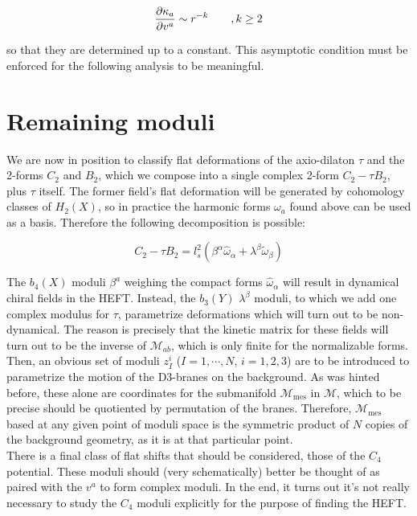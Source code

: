 \begin{equation}
	\frac{\partial\kappa_a}{\partial v^a} \sim r^{-k} \quad \quad, k \geq 2
	\label{asycond}
\end{equation}

so that they are determined up to a constant. This asymptotic condition must be enforced for the following analysis to be meaningful.

\section{Remaining moduli}

We are now in position to classify flat deformations of the axio-dilaton $\tau$ and the 2-forms $C_2$ and $B_2$, which we compose into a single complex 2-form $C_2 - \tau B_2$, plus $\tau$ itself. The former field's flat deformation will be generated by cohomology classes of $H_2(X)$, so in practice the harmonic forms $\omega_a$ found above can be used as a basis. Therefore the following decomposition is possible:

\begin{equation}
	C_2 - \tau B_2 = l_s^2 \left( \beta^\alpha \hat\omega_\alpha + \lambda^\beta \tilde \omega_\beta \right)
	\label{}
\end{equation}

The $b_4(X)$ moduli $\beta^a$ weighing the compact forms $\hat\omega_\alpha$ will result in dynamical chiral fields in the HEFT. Instead, the $b_3(Y)$ $\lambda^\beta$ moduli, to which we add one complex modulus for $\tau$, parametrize deformations which will turn out to be non-dynamical. The reason is precisely that the kinetic matrix for these fields will turn out to be the inverse of $\mathcal{M}_{ab}$, which is only finite for the normalizable forms.\\

Then, an obvious set of moduli $z_I^i$ ($I=1,\cdots,N$, $i = 1,2,3$) are to be introduced to parametrize the motion of the D3-branes on the background. As was hinted before, these alone are coordinates for the submanifold $\mathcal{M}_\text{mes}$ in $\mathcal{M}$, which to be precise should be quotiented by permutation of the branes. Therefore, $\mathcal{M}_\text{mes}$ based at any given point of moduli space is the symmetric product of $N$ copies of the background geometry, as it is at that particular point.\\

There is a final class of flat shifts that should be considered, those of the $C_4$ potential. These moduli should (very schematically) better be thought of as paired with the $v^a$ to form complex moduli. In the end, it turns out it's not really necessary to study the $C_4$ moduli explicitly for the purpose of finding the HEFT.



